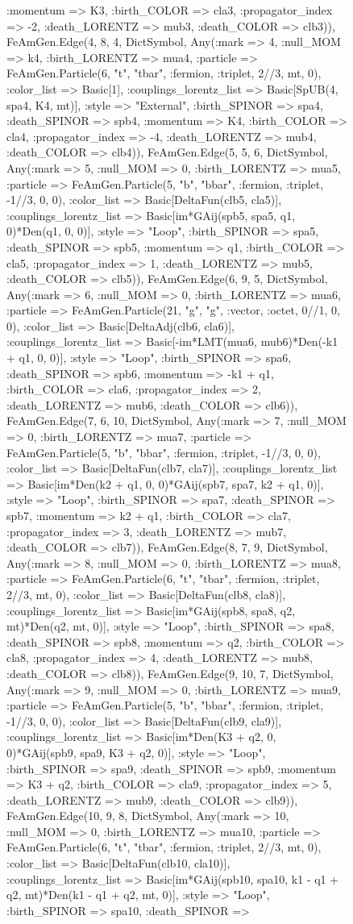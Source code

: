 \documentclass{revtex4}
\begin{document}
\begin{figure}[!htb]
\begin{center}
{:momentum => K3, :birth_COLOR => cla3, :propagator_index => -2, :death_LORENTZ => mub3, :death_COLOR => clb3)), FeAmGen.Edge(4, 8, 4, Dict{Symbol, Any}(:mark => 4, :null_MOM => k4, :birth_LORENTZ => mua4, :particle => FeAmGen.Particle(6, "t", "tbar", :fermion, :triplet, 2//3, mt, 0), :color_list => Basic[1], :couplings_lorentz_list => Basic[SpUB(4, spa4, K4, mt)], :style => "External", :birth_SPINOR => spa4, :death_SPINOR => spb4, :momentum => K4, :birth_COLOR => cla4, :propagator_index => -4, :death_LORENTZ => mub4, :death_COLOR => clb4)), FeAmGen.Edge(5, 5, 6, Dict{Symbol, Any}(:mark => 5, :null_MOM => 0, :birth_LORENTZ => mua5, :particle => FeAmGen.Particle(5, "b", "bbar", :fermion, :triplet, -1//3, 0, 0), :color_list => Basic[DeltaFun(clb5, cla5)], :couplings_lorentz_list => Basic[im*GAij(spb5, spa5, q1, 0)*Den(q1, 0, 0)], :style => "Loop", :birth_SPINOR => spa5, :death_SPINOR => spb5, :momentum => q1, :birth_COLOR => cla5, :propagator_index => 1, :death_LORENTZ => mub5, :death_COLOR => clb5)), FeAmGen.Edge(6, 9, 5, Dict{Symbol, Any}(:mark => 6, :null_MOM => 0, :birth_LORENTZ => mua6, :particle => FeAmGen.Particle(21, "g", "g", :vector, :octet, 0//1, 0, 0), :color_list => Basic[DeltaAdj(clb6, cla6)], :couplings_lorentz_list => Basic[-im*LMT(mua6, mub6)*Den(-k1 + q1, 0, 0)], :style => "Loop", :birth_SPINOR => spa6, :death_SPINOR => spb6, :momentum => -k1 + q1, :birth_COLOR => cla6, :propagator_index => 2, :death_LORENTZ => mub6, :death_COLOR => clb6)), FeAmGen.Edge(7, 6, 10, Dict{Symbol, Any}(:mark => 7, :null_MOM => 0, :birth_LORENTZ => mua7, :particle => FeAmGen.Particle(5, "b", "bbar", :fermion, :triplet, -1//3, 0, 0), :color_list => Basic[DeltaFun(clb7, cla7)], :couplings_lorentz_list => Basic[im*Den(k2 + q1, 0, 0)*GAij(spb7, spa7, k2 + q1, 0)], :style => "Loop", :birth_SPINOR => spa7, :death_SPINOR => spb7, :momentum => k2 + q1, :birth_COLOR => cla7, :propagator_index => 3, :death_LORENTZ => mub7, :death_COLOR => clb7)), FeAmGen.Edge(8, 7, 9, Dict{Symbol, Any}(:mark => 8, :null_MOM => 0, :birth_LORENTZ => mua8, :particle => FeAmGen.Particle(6, "t", "tbar", :fermion, :triplet, 2//3, mt, 0), :color_list => Basic[DeltaFun(clb8, cla8)], :couplings_lorentz_list => Basic[im*GAij(spb8, spa8, q2, mt)*Den(q2, mt, 0)], :style => "Loop", :birth_SPINOR => spa8, :death_SPINOR => spb8, :momentum => q2, :birth_COLOR => cla8, :propagator_index => 4, :death_LORENTZ => mub8, :death_COLOR => clb8)), FeAmGen.Edge(9, 10, 7, Dict{Symbol, Any}(:mark => 9, :null_MOM => 0, :birth_LORENTZ => mua9, :particle => FeAmGen.Particle(5, "b", "bbar", :fermion, :triplet, -1//3, 0, 0), :color_list => Basic[DeltaFun(clb9, cla9)], :couplings_lorentz_list => Basic[im*Den(K3 + q2, 0, 0)*GAij(spb9, spa9, K3 + q2, 0)], :style => "Loop", :birth_SPINOR => spa9, :death_SPINOR => spb9, :momentum => K3 + q2, :birth_COLOR => cla9, :propagator_index => 5, :death_LORENTZ => mub9, :death_COLOR => clb9)), FeAmGen.Edge(10, 9, 8, Dict{Symbol, Any}(:mark => 10, :null_MOM => 0, :birth_LORENTZ => mua10, :particle => FeAmGen.Particle(6, "t", "tbar", :fermion, :triplet, 2//3, mt, 0), :color_list => Basic[DeltaFun(clb10, cla10)], :couplings_lorentz_list => Basic[im*GAij(spb10, spa10, k1 - q1 + q2, mt)*Den(k1 - q1 + q2, mt, 0)], :style => "Loop", :birth_SPINOR => spa10, :death_SPINOR => }
\end{center}
\end{figure}
\end{document}
